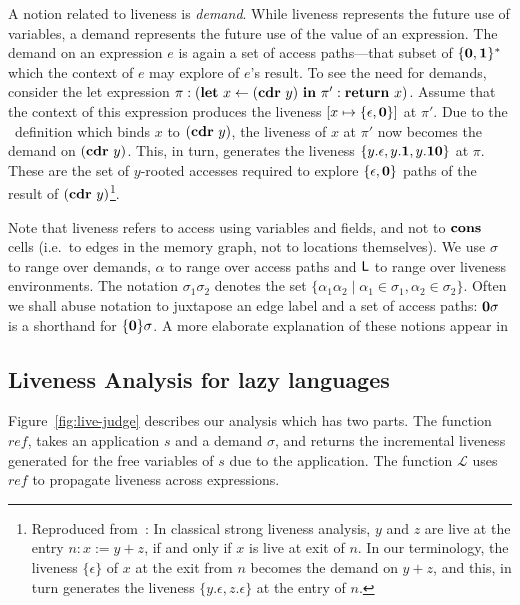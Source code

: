 \documentclass[9pt]{sigplanconf}
\begin{document}
A  notion  related  to  liveness  is  {\em  demand}.   While  liveness
represents the future use of variables, a demand represents the future
use of the value of an  expression. The demand on an expression $e$ is
again a  set of  access paths---that subset  of $\{\mathbf{0},\mathbf{1}\}^\ast$
which the context of $e$ may explore of $e$'s result.  To see the need
for  demands,  consider   the  let  expression  $\pi:(\mbox{$\mathbf{ let}$}~x\leftarrow
(\mbox{$\mathbf{cdr}$}~y)~\mbox{$\mathbf{ in}$}~  \pi':\mbox{$\mathbf{ return}$}~x)$.   Assume that  the  context of  this
expression produces  the liveness $[x \mapsto  \lbrace \epsilon, \mathbf{0}
  \rbrace]$ at $\pi'$.  Due to the \LET\ definition which binds $x$ to
$(\mbox{$\mathbf{cdr}$}~y)$, the  liveness of $x$ at  $\pi'$ now becomes  the demand on
$(\mbox{$\mathbf{cdr}$}~y)$.    This,  in   turn,  generates   the   liveness  $\lbrace
y.\epsilon, y.\mathbf{1}, y.\mathbf{1}\mathbf{0} \rbrace$ at $\pi$. These are the set
of $y$-rooted  accesses required  to explore $\lbrace  \epsilon, \mathbf{0}
\rbrace$  paths   of  the  result   of  $(\mbox{$\mathbf{cdr}$}~y)$\footnote{Reproduced
  from~\cite{asati14lgc}: In  classical strong liveness  analysis, $y$
  and $z$  are live at the  entry $n: x:=y+z$,  if and only if  $x$ is
  live  at exit  of $n$.   In our  terminology, the  liveness $\lbrace
  \epsilon\rbrace $ of $x$ at the  exit from $n$ becomes the demand on
  $y+z$, and this, in turn generates the liveness $\lbrace y.\epsilon,
  z.\epsilon \rbrace$ at the entry of $n$.}.


Note that  liveness refers to  access using variables and  fields, and
not  to $\mbox{$\mathbf{cons}$}$  cells (i.e.\  to edges  in the  memory graph,  not to
locations themselves).
We use $\sigma$  to range over demands, $\alpha$  to range over access
paths  and $\mathsf{L}$ to  range over  liveness environments.   The notation
$\sigma_1\sigma_2$  denotes  the  set $\lbrace  \alpha_1\alpha_2  \mid
\alpha_1 \in \sigma_1, \alpha_2  \in \sigma_2\rbrace$.  Often we shall
abuse notation to  juxtapose an edge label and a  set of access paths:
$\mathbf{0}\sigma$ is a shorthand for $\lbrace\mathbf{0}\rbrace\sigma$. A more
elaborate explanation of these notions appear in \cite{asati14lgc}


\subsection{Liveness Analysis for lazy languages}

Figure~\ref{fig:live-judge}  describes  our  analysis  which  has  two
parts. The function $\mathit{ref}$,  takes  an application $s$ and
a demand $\sigma$, and returns  the incremental liveness generated for the
free  variables   of  $s$  due  to  the   application.   The  function
$\mathcal{L}$  uses   $\mathit{ref}$  to  propagate   liveness  across
expressions.
\end{document}
